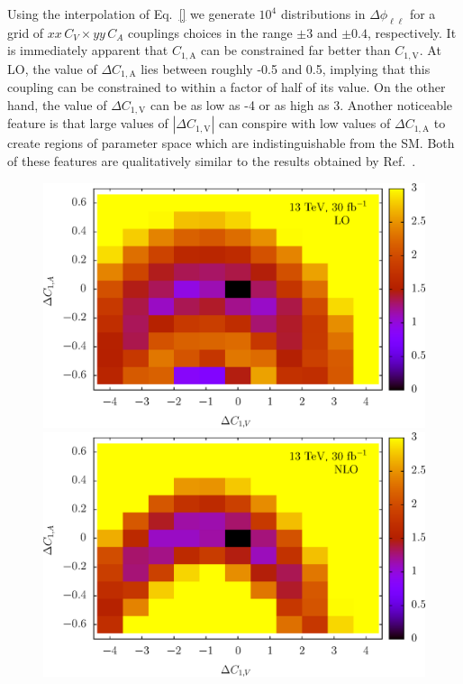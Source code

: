 \documentclass[preprint]{JHEP3} %
\def\ConeA{C_{1,\mathrm{A}}}
\def\ConeV{C_{1,\mathrm{V}}}
\def\DConeA{\Delta C_{1,\mathrm{A}}}
\def\DConeV{\Delta C_{1,\mathrm{V}}}
\begin{document}
Using the interpolation of Eq.~\ref{} we generate $10^4$ distributions in $\Delta \phi_{\ell\ell}$ for a grid of $xx \, C_V \times yy\, C_A$ couplings 
choices in the range $\pm 3$ and $\pm 0.4$, respectively. 
It is immediately apparent that $\ConeA$ can be constrained far better than $\ConeV$. 
At LO, the value of $\DConeA$ lies between roughly -0.5 and 0.5, implying that this coupling can be constrained to within a factor of half of its value. 
On the other hand, the value of $\DConeV$ can be as low as -4 or as high as 3. Another noticeable feature is that large values of $| \DConeV |$ can conspire 
with low values of $\DConeA$ to create regions of parameter space which are indistinguishable from the SM. 
Both of these features are qualitatively similar to the results obtained by Ref.~\cite{Baur:2004uw}. 
\begin{figure}[t]
\includegraphics[scale=0.5]{LHC_53_LLSign_13LO30.eps} 
\includegraphics[scale=0.5]{LHC_53_LLSign_13NLO30.eps} 

\end{figure}
\end{document}
